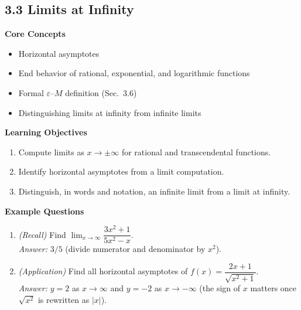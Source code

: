 \documentclass[11pt]{article}
\begin{document}
\subsection{3.3 Limits at Infinity}
\textbf{Core Concepts}
\begin{itemize}
\item Horizontal asymptotes
\item End behavior of rational, exponential, and logarithmic functions
\item Formal $\varepsilon$--$M$ definition (Sec.\ 3.6)
\item Distinguishing limits at infinity from infinite limits
\end{itemize}
\textbf{Learning Objectives}
\begin{enumerate}
\item Compute limits as $x\to\pm\infty$ for rational and transcendental functions.
\item Identify horizontal asymptotes from a limit computation.
\item Distinguish, in words and notation, an infinite limit from a limit at infinity.
\end{enumerate}
\textbf{Example Questions}
\begin{enumerate}
\item \emph{(Recall)} Find $\displaystyle\lim_{x\to\infty}\dfrac{3x^2+1}{5x^2-x}$. \\
\textit{Answer:} $3/5$ (divide numerator and denominator by $x^2$).
\item \emph{(Application)} Find all horizontal asymptotes of $f(x) = \dfrac{2x+1}{\sqrt{x^2+1}}$. \\
\textit{Answer:} $y=2$ as $x\to\infty$ and $y=-2$ as $x\to -\infty$ (the sign of $x$ matters once $\sqrt{x^2}$ is rewritten as $|x|$).
\end{enumerate}
\end{document}
